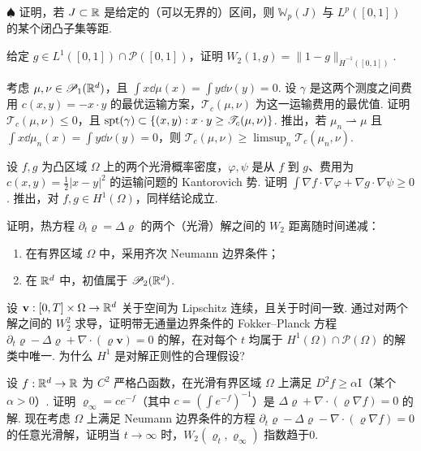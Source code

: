 \begin{exercise}\label{ex:63}
$\spadesuit$ 证明，若 $J\subset\mathbb R$ 是给定的（可以无界的）区间，则 $\mathbb W_p(J)$ 与 $L^p([0,1])$ 的某个闭凸子集等距.
\end{exercise}

\begin{exercise}\label{ex:64}
给定 $g\in L^1([0,1])\cap\mathscr P([0,1])$，证明 $W_2(1,g)=\|1-g\|_{\dot H^{-1}([0,1])}$.
\end{exercise}

\begin{exercise}\label{ex:65}
考虑 $\mu,\nu\in\mathscr P_1(\mathbb R^d)$，且 $\int x\dd\mu(x)=\int y\dd\nu(y)=0$. 设 $\gamma$ 是这两个测度之间费用 $c(x,y)=-x\cdot y$ 的最优运输方案，$\mathscr T_c(\mu,\nu)$ 为这一运输费用的最优值. 证明 $\mathscr T_c(\mu,\nu)\leq0$，且 $\operatorname{spt}(\gamma)\subset\{(x,y):x\cdot y\geq\mathscr T_c(\mu,\nu)\}$. 推出，若 $\mu_n\rightharpoonup\mu$ 且 $\int x\dd\mu_n(x)=\int y\dd\nu(y)=0$，则 $\mathscr T_c(\mu,\nu)\geq\limsup_n\mathscr T_c(\mu_n,\nu)$.
\end{exercise}

\begin{exercise}\label{ex:66}
设 $f,g$ 为凸区域 $\Omega$ 上的两个光滑概率密度，$\varphi,\psi$ 是从 $f$ 到 $g$、费用为 $c(x,y)=\frac12|x-y|^2$ 的运输问题的 Kantorovich 势. 证明 $\int\nabla f\cdot\nabla\varphi+\nabla g\cdot\nabla\psi\geq0$. 推出，对 $f,g\in H^1(\Omega)$，同样结论成立.
\end{exercise}

\begin{exercise}\label{ex:67}
证明，热方程 $\partial_t\varrho=\Delta\varrho$ 的两个（光滑）解之间的 $W_2$ 距离随时间递减：
\begin{enumerate}
\item 在有界区域 $\Omega$ 中，采用齐次 Neumann 边界条件；
\item 在 $\mathbb R^d$ 中，初值属于 $\mathscr P_2(\mathbb R^d)$.
\end{enumerate}
\end{exercise}

\begin{exercise}\label{ex:68}
设 $\mathbf v:[0,T]\times\Omega\to\mathbb R^d$ 关于空间为 Lipschitz 连续，且关于时间一致. 通过对两个解之间的 $W_2^2$ 求导，证明带无通量边界条件的 Fokker--Planck 方程 $\partial_t\varrho-\Delta\varrho+\nabla\cdot(\varrho\mathbf v)=0$ 的解，在对每个 $t$ 均属于 $H^1(\Omega)\cap\mathscr P(\Omega)$ 的解类中唯一. 为什么 $H^1$ 是对解正则性的合理假设?
\end{exercise}

\begin{exercise}\label{ex:69}
设 $f:\mathbb R^d\to\mathbb R$ 为 $C^2$ 严格凸函数，在光滑有界区域 $\Omega$ 上满足 $D^2f\geq\alpha\mathrm I$（某个 $\alpha>0$）. 证明 $\varrho_\infty=ce^{-f}$（其中 $c=(\int e^{-f})^{-1}$）是 $\Delta\varrho+\nabla\cdot(\varrho\nabla f)=0$ 的解. 现在考虑 $\Omega$ 上满足 Neumann 边界条件的方程 $\partial_t\varrho-\Delta\varrho-\nabla\cdot(\varrho\nabla f)=0$ 的任意光滑解，证明当 $t\to\infty$ 时，$W_2(\varrho_t,\varrho_\infty)$ 指数趋于0.
\end{exercise}
